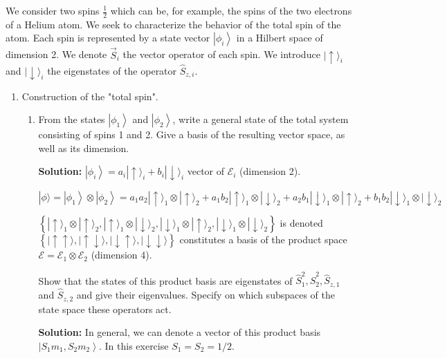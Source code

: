 \documentclass{article}
\begin{document}
    We consider two spins $\frac{1}{2}$ which can be, for example, the spins of the two electrons of a Helium atom. We seek to characterize the behavior of the total spin of the atom. Each spin is represented by a state vector $\left|\phi_{i}\right\rangle$ in a Hilbert space of dimension 2. We denote $\vec{S}_{i}$ the vector operator of each spin. We introduce $|\uparrow\rangle_{i}$ and $|\downarrow\rangle_{i}$ the eigenstates of the operator $\hat{S}_{z, i}$.

    \begin{enumerate}
        \item Construction of the "total spin".

        \begin{enumerate}
            \item From the states $\left|\phi_{1}\right\rangle$ and $\left|\phi_{2}\right\rangle$, write a general state of the total system consisting of spins 1 and 2. Give a basis of the resulting vector space, as well as its dimension.

            {\color{red}\textbf{Solution:} $\left|\phi_{i}\right\rangle = a_{i}|\uparrow\rangle_{i} + b_{i}|\downarrow\rangle_{i}$ vector of $\mathcal{E}_{i}$ (dimension 2).

            $$
            |\phi\rangle = \left|\phi_{1}\right\rangle \otimes \left|\phi_{2}\right\rangle = a_{1} a_{2}|\uparrow\rangle_{1} \otimes |\uparrow\rangle_{2} + a_{1} b_{2}|\uparrow\rangle_{1} \otimes |\downarrow\rangle_{2} + a_{2} b_{1}|\downarrow\rangle_{1} \otimes |\uparrow\rangle_{2} + b_{1} b_{2}|\downarrow\rangle_{1} \otimes |\downarrow\rangle_{2}
            $$

            $\left\{|\uparrow\rangle_{1} \otimes |\uparrow\rangle_{2}, |\uparrow\rangle_{1} \otimes |\downarrow\rangle_{2}, |\downarrow\rangle_{1} \otimes |\uparrow\rangle_{2}, |\downarrow\rangle_{1} \otimes |\downarrow\rangle_{2}\right\}$ is denoted $\left\{|\uparrow \uparrow\rangle, |\uparrow \downarrow\rangle, |\downarrow \uparrow\rangle, |\downarrow \downarrow\rangle\right\}$ constitutes a basis of the product space $\mathcal{E} = \mathcal{E}_{1} \otimes \mathcal{E}_{2}$ (dimension 4).

            Show that the states of this product basis are eigenstates of $\hat{S}_{1}^{2}, \hat{S}_{2}^{2}, \hat{S}_{z, 1}$ and $\hat{S}_{z, 2}$ and give their eigenvalues. Specify on which subspaces of the state space these operators act.

            \textbf{Solution:} In general, we can denote a vector of this product basis $\left|S_{1} m_{1}, S_{2} m_{2}\right\rangle$. In this exercise $S_{1} = S_{2} = 1 / 2$.

}
\end{enumerate}
\end{enumerate}
\end{document}
